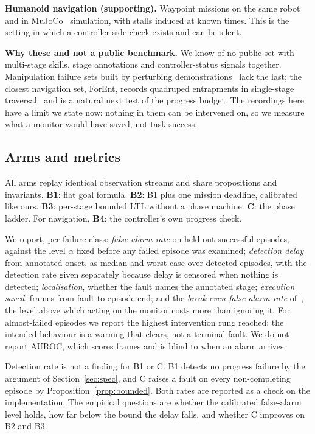\documentclass[letterpaper, 10pt, journal, twoside]{IEEEtran}
\begin{document}
\textbf{Humanoid navigation (supporting).} Waypoint missions on the same
robot and in MuJoCo~\cite{todorov2012mujoco} simulation, with stalls
induced at known times. This is the setting in which a controller-side
check exists and can be silent.

\textbf{Why these and not a public benchmark.} We know of no public set
with multi-stage skills, stage annotations and controller-status
signals together. Manipulation failure sets built by perturbing
demonstrations~\cite{duan2025aha,pacaud2025guardian,liu2023reflect} lack
the last; the closest navigation set, ForEnt, records quadruped
entrapments in single-stage traversal~\cite{kirdwichai2026forent} and is
a natural next test of the progress budget. The recordings here have a
limit we state now: nothing in them can be intervened on, so we measure
what a monitor would have saved, not task success.

\subsection{Arms and metrics}

All arms replay identical observation streams and share propositions and
invariants. \textbf{B1}: flat goal formula. \textbf{B2}: B1 plus one
mission deadline, calibrated like ours. \textbf{B3}: per-stage bounded
LTL without a phase machine. \textbf{C}: the phase ladder. For
navigation, \textbf{B4}: the controller's own progress check.

We report, per failure class:
\emph{false-alarm rate} on held-out successful episodes, against the
level $\alpha$ fixed before any failed episode was examined;
\emph{detection delay} from annotated onset, as median and worst case
over detected episodes, with the detection rate given separately because
delay is censored when nothing is detected;
\emph{localisation}, whether the fault names the annotated stage;
\emph{execution saved}, frames from fault to episode end; and the
\emph{break-even false-alarm rate} of~\cite{ahmedt2026rescue}, the level
above which acting on the monitor costs more than ignoring it.
For almost-failed episodes we report the highest intervention rung
reached: the intended behaviour is a warning that clears, not a terminal
fault. We do not report AUROC, which scores frames and is blind to when
an alarm arrives.

Detection rate is not a finding for B1 or C. B1 detects no progress
failure by the argument of Section~\ref{sec:spec}, and C raises a fault
on every non-completing episode by Proposition~\ref{prop:bounded}. Both
rates are reported as a check on the implementation. The empirical
questions are whether the calibrated false-alarm level holds, how far
below the bound the delay falls, and whether C improves on B2 and B3.
\end{document}
